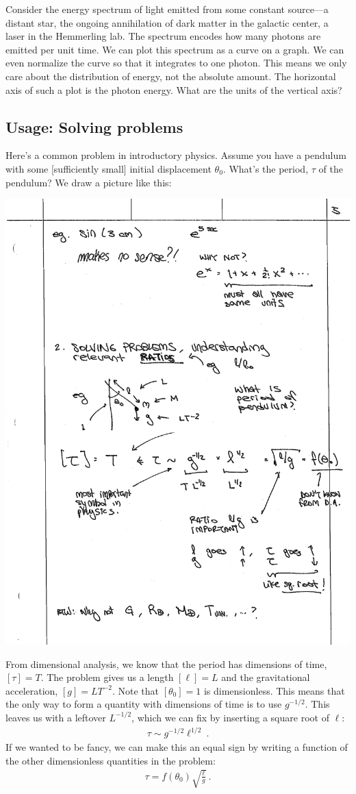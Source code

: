 \begin{exercise}
Consider the energy spectrum of light emitted from some constant source---a distant star, the ongoing annihilation of dark matter in the galactic center, a laser in the Hemmerling lab. The spectrum encodes how many photons are emitted per unit time. We can plot this spectrum as a curve on a graph. We can even normalize the curve so that it integrates to one photon. This means we only care about the distribution of energy, not the absolute amount. The horizontal axis of such a plot is the photon energy. What are the units of the vertical axis?
\end{exercise}


\subsection{Usage: Solving problems}

Here’s a common problem in introductory physics. Assume you have a pendulum with some [sufficiently small] initial displacement $\theta_0$. What’s the period, $\tau$ of the pendulum? We draw a picture like this:

\begin{center}
\includegraphics[width=.4\textwidth]{figures/lec01_pendulum.pdf}
\end{center}
%
From dimensional analysis, we know that the period has dimensions of time, $[\tau] = T$. The problem gives us a length $[\ell]=L$ and the gravitational acceleration, $[g]=LT^{-2}$. Note that $[\theta_0] = 1$ is dimensionless. This means that the only way to form a quantity with dimensions of time is to use $g^{-1/2}$. This leaves us with a leftover $L^{-1/2}$, which we can fix by inserting a square root of $\ell$:
\begin{align}
  \tau \sim g^{-1/2} \ell^{1/2} \ .
\end{align}
If we wanted to be fancy, we can make this an equal sign by writing a function of the other dimensionless quantities in the problem:
\begin{align}
  \tau = f(\theta_0) \sqrt{\frac{\ell}{g}} \ .
\end{align}


